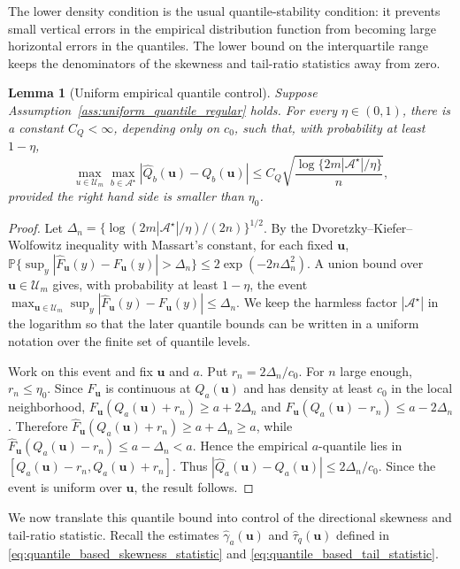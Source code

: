 \documentclass[11pt]{article}
\theoremstyle{plain}
\newtheorem{lemma}{Lemma}
\theoremstyle{definition}
\theoremstyle{remark}
\def\u{\bm{u}}
\newcommand{\Prob}{\mathbb{P}}
\newcommand{\abs}[1]{\left\lvert #1 \right\rvert}
\begin{document}
The lower density condition is the usual quantile-stability condition: it prevents small vertical errors in the empirical distribution function from becoming large horizontal errors in the quantiles. The lower bound on the interquartile range keeps the denominators of the skewness and tail-ratio statistics away from zero.

\begin{lemma}[Uniform empirical quantile control]
	\label{lem:uniform_quantile_control}
	Suppose Assumption~\ref{ass:uniform_quantile_regular} holds. For every \(\eta\in(0,1)\), there is a constant \(C_Q<\infty\), depending only on \(c_0\), such that, with probability at least \(1-\eta\),
	\[
	\max_{u\in\mathcal U_m}\max_{b\in\mathcal A^\star} \abs{\widehat Q_b(\u)-Q_b(\u)} \leqslant C_Q\sqrt{\frac{\log\{2m|\mathcal A^\star|/\eta\}}{n}},
	\]
	provided the right hand side is smaller than \(\eta_0\).
\end{lemma}

\begin{proof}
	Let \(\Delta_n=\{\log(2m|\mathcal A^\star|/\eta)/(2n)\}^{1/2}\). By the Dvoretzky--Kiefer--Wolfowitz inequality with Massart's constant, for each fixed $\u$, \(\Prob\{\sup_y|\widehat F_{\u}(y)-F_{\u}(y)|>\Delta_n\}\leqslant 2\exp(-2n\Delta_n^2)\). A union bound over \(\u\in\mathcal U_m\) gives, with probability at least \(1-\eta\), the event \(\max_{\u\in\mathcal U_m}\sup_y|\widehat F_{\u}(y)-F_{\u}(y)|\leqslant \Delta_n\). We keep the harmless factor \(|\mathcal A^\star|\) in the logarithm so that the later quantile bounds can be written in a uniform notation over the finite set of quantile levels.
	
	Work on this event and fix $\u$ and \(a\). Put \(r_n=2\Delta_n/c_0\). For \(n\) large enough, \(r_n \leqslant \eta_0\). Since \(F_{\u}\) is continuous at \(Q_a(\u)\) and has density at least \(c_0\) in the local neighborhood, \(F_{\u}(Q_a(\u)+r_n)\geqslant a+2\Delta_n\) and \(F_{\u}(Q_a(\u)-r_n)\leqslant a-2\Delta_n\). Therefore \(\widehat F_{\u}(Q_a(\u)+r_n)\geqslant a+\Delta_n\geqslant a\), while \(\widehat F_{\u}(Q_a(\u)-r_n)\leqslant a-\Delta_n<a\). Hence the empirical \(a\)-quantile lies in \([Q_a(\u)-r_n,Q_a(\u)+r_n]\). Thus \(|\widehat Q_a(\u)-Q_a(\u)|\leqslant 2\Delta_n/c_0\). Since the event is uniform over $\u$, the result follows.
\end{proof}

We now translate this quantile bound into control of the directional skewness and tail-ratio statistic. Recall the estimates \(\widehat\gamma_a(\u)\) and \(\widehat\tau_q(\u)\) defined in \eqref{eq:quantile_based_skewness_statistic} and \eqref{eq:quantile_based_tail_statistic}. 
\end{document}
